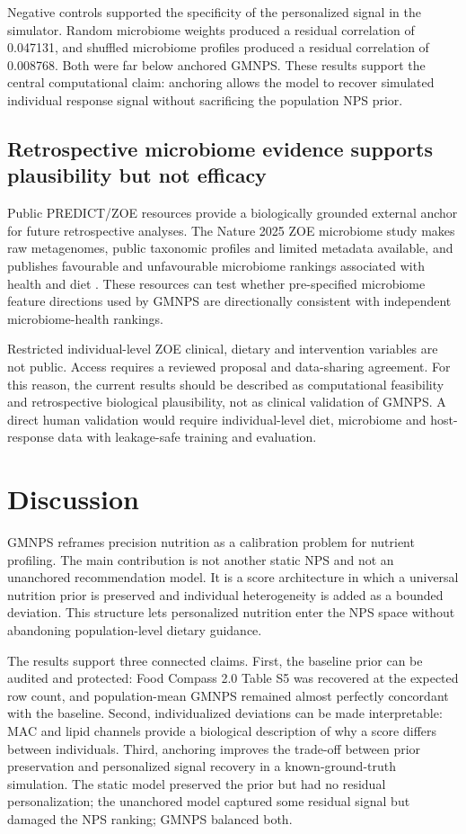 Negative controls supported the specificity of the personalized signal in the
simulator. Random microbiome weights produced a residual correlation of
0.047131, and shuffled microbiome profiles produced a residual correlation of
0.008768. Both were far below anchored GMNPS. These results support the
central computational claim: anchoring allows the model to recover simulated
individual response signal without sacrificing the population NPS prior.

\subsection*{Retrospective microbiome evidence supports plausibility but not efficacy}

Public PREDICT/ZOE resources provide a biologically grounded external anchor
for future retrospective analyses. The Nature 2025 ZOE microbiome study makes
raw metagenomes, public taxonomic profiles and limited metadata available, and
publishes favourable and unfavourable microbiome rankings associated with
health and diet \cite{asnicar2025gut}. These resources can test whether
pre-specified microbiome feature directions used by GMNPS are directionally
consistent with independent microbiome-health rankings.

Restricted individual-level ZOE clinical, dietary and intervention variables
are not public. Access requires a reviewed proposal and data-sharing agreement.
For this reason, the current results should be described as computational
feasibility and retrospective biological plausibility, not as clinical
validation of GMNPS. A direct human validation would require individual-level
diet, microbiome and host-response data with leakage-safe training and
evaluation.

\section*{Discussion}

GMNPS reframes precision nutrition as a calibration problem for nutrient
profiling. The main contribution is not another static NPS and not an
unanchored recommendation model. It is a score architecture in which a
universal nutrition prior is preserved and individual heterogeneity is added as
a bounded deviation. This structure lets personalized nutrition enter the NPS
space without abandoning population-level dietary guidance.

The results support three connected claims. First, the baseline prior can be
audited and protected: Food Compass 2.0 Table S5 was recovered at the expected
row count, and population-mean GMNPS remained almost perfectly concordant with
the baseline. Second, individualized deviations can be made interpretable: MAC
and lipid channels provide a biological description of why a score differs
between individuals. Third, anchoring improves the trade-off between prior
preservation and personalized signal recovery in a known-ground-truth
simulation. The static model preserved the prior but had no residual
personalization; the unanchored model captured some residual signal but damaged
the NPS ranking; GMNPS balanced both.

